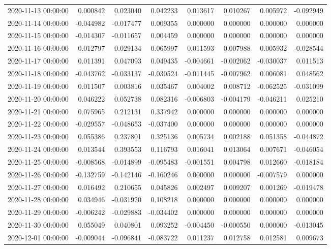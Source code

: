 \begin{tabular}{lrrrrrrr}
2020-11-13 00:00:00 & 0.000842 & 0.023040 & 0.042233 & 0.013617 & 0.010267 & 0.005972 & -0.092949 \\
2020-11-14 00:00:00 & -0.044982 & -0.017477 & 0.009355 & 0.000000 & 0.000000 & 0.000000 & 0.000000 \\
2020-11-15 00:00:00 & -0.014307 & -0.011657 & 0.004459 & 0.000000 & 0.000000 & 0.000000 & 0.000000 \\
2020-11-16 00:00:00 & 0.012797 & 0.029134 & 0.065997 & 0.011593 & 0.007988 & 0.005932 & -0.028544 \\
2020-11-17 00:00:00 & 0.011391 & 0.047093 & 0.049435 & -0.004661 & -0.002062 & -0.030037 & 0.011513 \\
2020-11-18 00:00:00 & -0.043762 & -0.033137 & -0.030524 & -0.011445 & -0.007962 & 0.006081 & 0.048562 \\
2020-11-19 00:00:00 & 0.011507 & 0.003816 & 0.035467 & 0.004002 & 0.008712 & -0.062525 & -0.031099 \\
2020-11-20 00:00:00 & 0.046222 & 0.052738 & 0.082316 & -0.006803 & -0.004179 & -0.046211 & 0.025210 \\
2020-11-21 00:00:00 & 0.075965 & 0.212131 & 0.337942 & 0.000000 & 0.000000 & 0.000000 & 0.000000 \\
2020-11-22 00:00:00 & -0.029557 & -0.048653 & -0.037400 & 0.000000 & 0.000000 & 0.000000 & 0.000000 \\
2020-11-23 00:00:00 & 0.055386 & 0.237801 & 0.325136 & 0.005734 & 0.002188 & 0.051358 & -0.044872 \\
2020-11-24 00:00:00 & 0.013544 & 0.393553 & 0.116793 & 0.016041 & 0.013064 & 0.007671 & -0.046054 \\
2020-11-25 00:00:00 & -0.008568 & -0.014899 & -0.095483 & -0.001551 & 0.004798 & 0.012660 & -0.018184 \\
2020-11-26 00:00:00 & -0.132759 & -0.142146 & -0.160246 & 0.000000 & 0.000000 & -0.007579 & 0.000000 \\
2020-11-27 00:00:00 & 0.016492 & 0.210655 & 0.045826 & 0.002497 & 0.009207 & 0.001269 & -0.019478 \\
2020-11-28 00:00:00 & 0.034946 & -0.031920 & 0.108218 & 0.000000 & 0.000000 & 0.000000 & 0.000000 \\
2020-11-29 00:00:00 & -0.006242 & -0.029883 & -0.034402 & 0.000000 & 0.000000 & 0.000000 & 0.000000 \\
2020-11-30 00:00:00 & 0.055049 & 0.040801 & 0.093252 & -0.004450 & -0.000550 & 0.000000 & -0.013045 \\
2020-12-01 00:00:00 & -0.009044 & -0.096841 & -0.083722 & 0.011237 & 0.012758 & 0.012581 & 0.009673 \\

\end{tabular}
